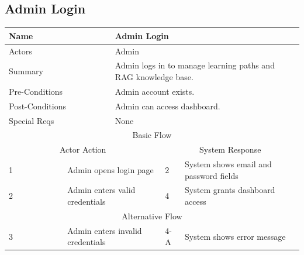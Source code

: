 \documentclass{FastFyp}
\begin{document}
\vspace{1em}

\subsection{Admin Login}
\noindent
\begin{minipage}{\textwidth}
\centering
{}
\label{tab:adminlogin}
\begin{tabular}{|p{}|p{}|p{}|p{}|p{}|}
\hline
\multicolumn{2}{|p{0.15\textwidth}|}{Name} &
  \multicolumn{3}{p{0.75\textwidth}|}{Admin Login} \\ \hline
\multicolumn{2}{|p{0.15\textwidth}|}{Actors} &
  \multicolumn{3}{p{0.75\textwidth}|}{Admin} \\ \hline
\multicolumn{2}{|p{0.15\textwidth}|}{Summary} &
  \multicolumn{3}{p{0.75\textwidth}|}{Admin logs in to manage learning paths and RAG knowledge base.} \\ \hline
\multicolumn{2}{|p{0.15\textwidth}|}{Pre-Conditions} &
  \multicolumn{3}{p{0.75\textwidth}|}{Admin account exists.} \\ \hline
\multicolumn{2}{|p{0.15\textwidth}|}{Post-Conditions} &
  \multicolumn{3}{p{0.75\textwidth}|}{Admin can access dashboard.} \\ \hline
\multicolumn{2}{|p{0.15\textwidth}|}{Special Reqs} &
  \multicolumn{3}{p{0.75\textwidth}|}{None} \\ \hline
\multicolumn{5}{|c|}{Basic Flow} \\ \hline
\multicolumn{3}{|c|}{Actor Action} &
  \multicolumn{2}{c|}{System Response} \\ \hline
1 &
  \multicolumn{2}{p{0.42\textwidth}|}{Admin opens login page} &
  2 &
  System shows email and password fields \\ \hline
2 &
  \multicolumn{2}{p{0.42\textwidth}|}{Admin enters valid credentials} &
  4 &
  System grants dashboard access \\ \hline
\multicolumn{5}{|c|}{Alternative Flow} \\ \hline
3 &
  \multicolumn{2}{p{0.42\textwidth}|}{Admin enters invalid credentials} &
  4-A &
  System shows error message \\ \hline
\end{tabular}
\end{minipage}

\vspace{1em}
\end{document}
